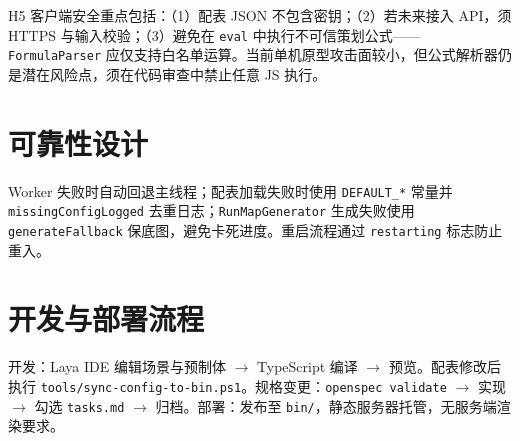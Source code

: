 H5 客户端安全重点包括：（1）配表 JSON 不包含密钥；（2）若未来接入 API，须 HTTPS 与输入校验；（3）避免在 \texttt{eval} 中执行不可信策划公式——\texttt{FormulaParser} 应仅支持白名单运算\cite{kw_skill_formula}。当前单机原型攻击面较小，但公式解析器仍是潜在风险点，须在代码审查中禁止任意 JS 执行。

\section{可靠性设计}

Worker 失败时自动回退主线程；配表加载失败时使用 \texttt{DEFAULT\_*} 常量并 \texttt{missingConfigLogged} 去重日志；\texttt{RunMapGenerator} 生成失败使用 \texttt{generateFallback} 保底图，避免卡死进度。重启流程通过 \texttt{restarting} 标志防止重入。

\section{开发与部署流程}

开发：Laya IDE 编辑场景与预制体 $\rightarrow$ TypeScript 编译 $\rightarrow$ 预览。配表修改后执行 \texttt{tools/sync-config-to-bin.ps1}。规格变更：\texttt{openspec validate} $\rightarrow$ 实现 $\rightarrow$ 勾选 \texttt{tasks.md} $\rightarrow$ 归档。部署：发布至 \texttt{bin/}，静态服务器托管，无服务端渲染要求\cite{kw_project_management_agile}。
